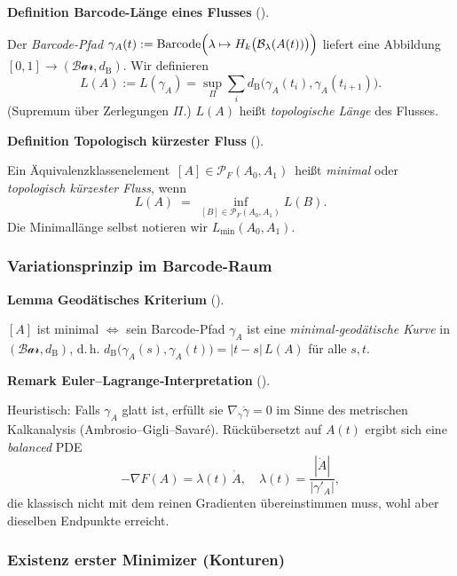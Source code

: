 \documentclass[10pt, letterpaper]{article}
\newcommand{\CustomHeading}[3]{%
  \par\medskip\noindent%
  \textbf{#1 #2} \textnormal{(#3)}.\enskip%
}
\newenvironment{DEF}[2]{\CustomHeading{Definition}{#1}{#2}}{}
\newenvironment{LEM}[2]{\CustomHeading{Lemma}{#1}{#2}}{}
\newenvironment{REM}[2]{\CustomHeading{Remark}{#1}{#2}}{}
\begin{document}
\begin{DEF}{Barcode-Länge eines Flusses}{}
  Der \emph{Barcode-Pfad}
  \(
    \gamma_A(t):=
      \text{Barcode}\Bigl(\lambda\mapsto H_k\bigl(\mathcal B_\lambda(A(t))\bigr)\Bigr)
  \)
  liefert eine Abbildung
  $[0,1]\to(\mathcal{Bar},d_{\mathrm B})$.
  Wir definieren
  \[
    L(A):=L(\gamma_A)
      =\sup_{\Pi}\sum_i
         d_{\mathrm B}\bigl(\gamma_A(t_i),\gamma_A(t_{i+1})\bigr).
  \]
  (Supremum über Zerlegungen $\Pi$.)  
  $L(A)$ heißt \emph{topologische Länge} des Flusses.
\end{DEF}

\begin{DEF}{Topologisch kürzester Fluss}{}
  Ein Äquivalenzklassenelement
  $\,[A]\in\mathscr P_F(A_0,A_1)\,$
  heißt \emph{minimal} oder \emph{topologisch kürzester Fluss},
  wenn
  \[
    L(A)\;=\;
    \inf_{[B]\in\mathscr P_F(A_0,A_1)} L(B).
  \]
  Die Minimal­länge selbst notieren wir
  \(
    L_{\min}(A_0,A_1).
  \)
\end{DEF}

\subsubsection*{Variationsprinzip im Barcode-Raum}

\begin{LEM}{Geodätisches Kriterium}{}
  \([A]\) ist minimal  $\Longleftrightarrow$
  sein Barcode-Pfad $\gamma_A$ ist eine \emph{minimal‐geodätische Kurve}
  in $(\mathcal{Bar},d_{\mathrm B})$,
  d.\,h.
  \(
    d_{\mathrm B}\bigl(\gamma_A(s),\gamma_A(t)\bigr)
      =|t-s|\,L(A)
  \)
  für alle $s,t$.
\end{LEM}

\begin{REM}{Euler–Lagrange‐Interpretation}{}
  Heuristisch:  
  Falls $\gamma_A$ glatt ist,
  erfüllt sie
  \(
    \nabla_{\dot\gamma} \dot\gamma = 0
  \)
  im Sinne des metrischen Kalkanaly­sis (Ambrosio–Gigli–Savaré).  
  Rückübersetzt auf $A(t)$ ergibt sich
  eine \emph{balanced} PDE
  \[
    -\nabla F(A) = \lambda(t)\,\dot A,
  \quad
    \lambda(t)=\frac{|\dot A|}{|\gamma'_A|},
  \]
  die klassisch nicht mit dem reinen Gradienten übereinstimmen muss,
  wohl aber dieselben Endpunkte erreicht.
\end{REM}

\subsubsection*{Existenz erster Minimizer (Konturen)}
\end{document}
